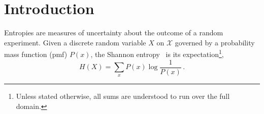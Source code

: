 \documentclass[aps,pra,11pt,onecolumn,nofootinbib,tightenlines]{revtex4-2}
\theoremstyle{definition}
\newcommand{\mc}[1]{\mathcal{#1}}
\begin{document}
\maketitle


\begingroup
\renewcommand{\thefootnote}{\fnsymbol{footnote}}

{} %
{}                         %

\endgroup

\tableofcontents

\section{Introduction}

Entropies are measures of uncertainty about the outcome of a random experiment. Given a discrete random variable $X$ on $\mc{X}$ governed by a probability mass function (pmf) $P(x)$, the Shannon entropy~\cite{shannon1948mathematical} is its expectation\footnote{Unless stated otherwise, all sums are understood to run over the full domain.},
\begin{equation}
    H(X) = \sum_{x} P(x) \log \frac{1}{P(x)} \,.
\end{equation}
\end{document}
